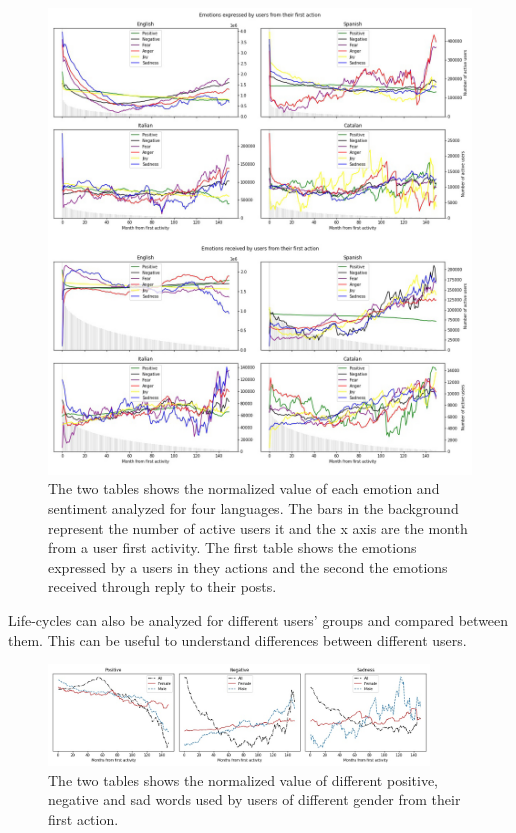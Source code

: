 \begin{figure}[H]
    \centering
    \includegraphics[width=1\textwidth]{./img/mstart.jpg}
    \caption{ The two tables shows the normalized value of each emotion and sentiment analyzed for four languages.  The bars in the background represent the number of active users it and the x axis are the month from a user first activity. The first table shows the emotions expressed by a users in they actions and the second the emotions received through reply to their posts. }
    \label{fig:mstart}
\end{figure}

Life-cycles can also be analyzed for different users' groups and compared between them. This can be useful to understand differences between different users.

\begin{figure}[H]
    \centering
    \includegraphics[width=0.9\textwidth]{./img/gtime.jpg}
    \caption{ The two tables shows the normalized value of different positive, negative and sad words used by users of different gender from their first action. }
    \label{fig:gtime}
\end{figure}

